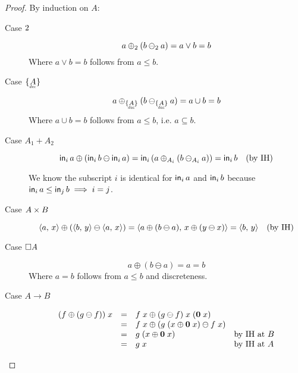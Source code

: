 \documentclass{article}
\begin{document}
\begin{proof}
  By induction on $A$:
  \begin{description}
    \item[Case $2$]
      \begin{equation*}
      a \oplus_2 (b \ominus_2 a) = a \vee b = b
      \end{equation*}
      Where $a \vee b = b$ follows from $a \le b$.

    \item[Case $\Seteq{A}$]
      \begin{equation*}
        a \oplus_{\Seteq{A}} (b \ominus_{\Seteq{A}} a)
        = a \cup b
        = b
      \end{equation*}
      Where $a \cup b = b$ follows from $a \le b$, i.e. $a \subseteq b$.

    \item[Case $A_1 + A_2$]
      \begin{equation*}
        \mathsf{in}_{i}\,{a} \oplus (\mathsf{in}_{i}\,{b} \ominus \mathsf{in}_{i}\,{a})
        = \mathsf{in}_{i}\,{(a \oplus_{A_i} (b \ominus_{A_i} a))}
        = \mathsf{in}_{i}\,{b}  \quad\text{(by IH)}
      \end{equation*}

      We know the subscript $i$ is identical for $\mathsf{in}_{i}\,{a}$ and $\mathsf{in}_{i}\,{b}$
      because $\mathsf{in}_{i}\,{a} \le \mathsf{in}_{j}\,{b} \implies i = j$.

    \item[Case $A \times B$]
      \begin{equation*}
        \langle{{a},\,{x}}\rangle \oplus (\langle{{b},\,{y}}\rangle \ominus \langle{{a},\,{x}}\rangle)
        = \langle{{a \oplus (b \ominus a)},\,{x \oplus (y \ominus x)}}\rangle
        = \langle{{b},\,{y}}\rangle \quad\text{(by IH)}
      \end{equation*}

    \item[Case $\square{A}$]
      \begin{equation*}
        a \oplus (b \ominus a) = a = b
      \end{equation*}
      Where $a = b$ follows from $a \le b$ and discreteness.


    \item[Case $A \to B$]
      \[\begin{array}{rcll}
      (f \oplus (g \ominus f))\; x
      &=& f\;x \oplus (g \ominus f)\; x\; (\mathbf{0}\; x)\\
      &=& f\;x \oplus (g \; (x \oplus \mathbf{0}\; x) \ominus f \; x)\\
      &=& g\; (x \oplus \mathbf{0}\; x) & \text{by IH at $B$}\\
      &=& g\; x & \text{by IH at $A$}
      \end{array}\]

  \end{description}
\end{proof}
\end{document}

